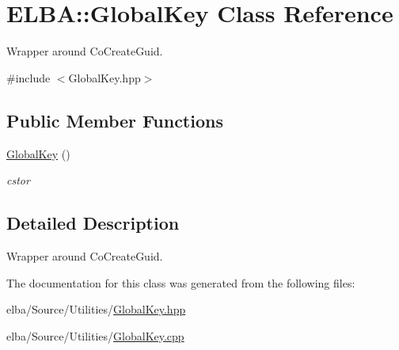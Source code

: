 \hypertarget{class_e_l_b_a_1_1_global_key}{}\section{E\+L\+BA\+:\+:Global\+Key Class Reference}
\label{class_e_l_b_a_1_1_global_key}


Wrapper around Co\+Create\+Guid.  




{\ttfamily \#include $<$Global\+Key.\+hpp$>$}

\subsection*{Public Member Functions}
\begin{DoxyCompactItemize}
\item 
\mbox{\label{class_e_l_b_a_1_1_global_key_a7966a32a8647b19f58de14824ac7fa1a}} 
\mbox{\hyperlink{class_e_l_b_a_1_1_global_key_a7966a32a8647b19f58de14824ac7fa1a}{Global\+Key}} ()
\begin{DoxyCompactList}\small\item\em cstor \end{DoxyCompactList}\end{DoxyCompactItemize}


\subsection{Detailed Description}
Wrapper around Co\+Create\+Guid. 

The documentation for this class was generated from the following files\+:\begin{DoxyCompactItemize}
\item 
elba/\+Source/\+Utilities/\mbox{\hyperlink{_global_key_8hpp}{Global\+Key.\+hpp}}\item 
elba/\+Source/\+Utilities/\mbox{\hyperlink{_global_key_8cpp}{Global\+Key.\+cpp}}\end{DoxyCompactItemize}
